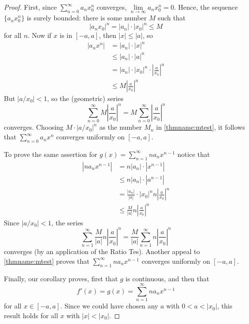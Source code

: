 \documentclass[12pt, a4paper, oneside, openright, titlepage]{book}
\begin{document}
\begin{proof}
    First, since $\sum\limits_{n=0}^{\infty}a_nx_0^n$ converges, $\lim\limits_{n\rightarrow \infty}a_nx_0^n = 0$. Hence, the sequence $\{a_nx_0^n\}$ is surely bounded: there is some number $M$ such that \begin{equation*}
        |a_nx_0|^n = |a_n|\cdot|x_0|^n \leq M
    \end{equation*}
    for all $n$. Now if $x$ is in $[-a,a]$, then $|x| \leq |a|$, so \begin{align*}
        |a_nx^n| &= |a_n|\cdot |x|^n \\
        &\leq |a_n|\cdot|a|^n \\
        &= |a_n|\cdot|x_0|^n\cdot\left|\frac{a}{x_0}\right|^n \\
        &\leq M\left|\frac{a}{x_0}\right|^n
    \end{align*}
    But $|a/x_0| < 1$, so the (geometric) series \begin{equation*}
        \sum\limits_{n=0}^{\infty}M\left|\frac{a}{x_0}\right|^n = M\sum\limits_{n=0}^{\infty}\left|\frac{a}{x_0}\right|^n
    \end{equation*}
    converges. Choosing $M\cdot|a/x_0|^n$ as the number $M_n$ in \ref{thmname:mtest}, it follows that $\sum\limits_{n=0}^{\infty}a_nx^n$ converges uniformly on $[-a,a]$.


    To prove the same assertion for $g(x) = \sum\limits_{n=1}^{\infty}na_nx^{n-1}$ notice that \begin{align*}
        |na_nx^{n-1}| &= n|a_n|\cdot |x^{n-1}| \\
        &\leq n|a_n|\cdot|a^{n-1}| \\
        &= \frac{|a_n|}{|a|}\cdot|x_0|^nn\left|\frac{a}{x_0}\right|^n \\
        &\leq \frac{M}{|a|}n\left|\frac{a}{x_0}\right|^n
    \end{align*}
    Since $|a/x_0| < 1$, the series \begin{equation*}
        \sum\limits_{n=1}^{\infty} \frac{M}{|a|}n\left|\frac{a}{x_0}\right|^n = \frac{M}{|a|}\sum\limits_{n=1}^{\infty}n\left|\frac{a}{x_0}\right|^n
    \end{equation*}
    converges (by an application of the Ratio Tes). Another appeal to \ref{thmname:mtest} proves that $\sum\limits_{n=1}^{\infty}na_nx^{n-1}$ converges uniformly on $[-a,a]$.

    Finally, our corollary proves, first that $g$ is continuous, and then that \begin{equation*}
        f'(x) = g(x) = \sum\limits_{n=1}^{\infty}na_nx^{n-1}
    \end{equation*}
    for all $x \in [-a,a]$. Since we could have chosen any $a$ with $0 < a < |x_0|$, this result holds for all $x$ with $|x| < |x_0|$.
\end{proof}
\end{document}
